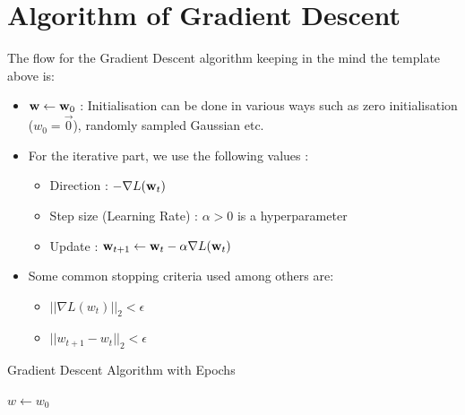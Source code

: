 \section{Algorithm of Gradient Descent}
The flow for the Gradient Descent algorithm keeping in the mind the template above is:
\begin{itemize}
  \item $\textbf{w} \leftarrow \textbf{w}_{0}$ : Initialisation can be done in various ways such as zero initialisation ($w_{0} = \Vec{0}$), randomly sampled Gaussian etc.
  \item For the iterative part, we use the following values :
        \begin{itemize}
          \item Direction : $- \nabla L(\textbf{w}_{t})$
          \item Step size (Learning Rate) : $\alpha > 0$ is a hyperparameter
          \item Update : $\textbf{w}_{t+1} \leftarrow \textbf{w}_{t} - \alpha \nabla L(\textbf{w}_{t})$
        \end{itemize}
  \item Some common stopping criteria used among others are:
        \begin{itemize}
          \item $|| \nabla L(w_{t}) ||_{2} < \epsilon$
          \item $|| w_{t+1} - w_{t} ||_{2} < \epsilon$
        \end{itemize}
\end{itemize}

\begin{algorithm}[H]
  \caption{Gradient Descent Algorithm with Epochs}
  \label{algo:gradient_descent_epochs}
  $w \gets w_0$\;
\end{algorithm}

